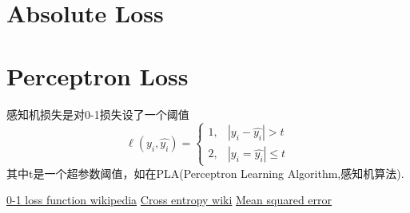 \documentclass[hyperref, UTF-8]{ctexart}
\begin{document}
\section{Absolute Loss}

\section{Perceptron Loss}
感知机损失是对0-1损失设了一个阈值
\begin{displaymath}
  \ell{( y_i, \hat{y_i} )} = \left\{
      \begin{array}{ll}
        1,&|y_i - \hat{y_i}| > t \\
        2,& |{y_i = \hat{y_i}}| \leq t
      \end{array} 
\right.
\end{displaymath}
其中t是一个超参数阈值，如在PLA(Perceptron Learning Algorithm,感知机算法).

\begin{thebibliography}{99}
  \href{https://en.wikipedia.org/wiki/Loss_function#0-1_loss_function}{0-1 loss
    function wikipedia}
  \href{https://en.wikipedia.org/wiki/Cross_entropy#Cross-entropy_error_function_and_logistic_regression}{Cross
    entropy wiki}
 \href{https://en.wikipedia.org/wiki/Mean_squared_error}{Mean squared error}
\end{thebibliography}
\end{document}
